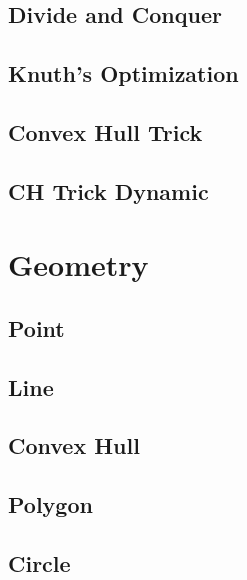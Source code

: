 \subsection{Divide and Conquer}
\raggedbottom
\hrulefill
\subsection{Knuth's Optimization}
\raggedbottom
\hrulefill
\subsection{Convex Hull Trick}
\raggedbottom
\hrulefill
\subsection{CH Trick Dynamic}
\raggedbottom
\hrulefill

\section{Geometry}
\subsection{Point}
\raggedbottom
\hrulefill
\subsection{Line}
\raggedbottom
\hrulefill
\subsection{Convex Hull}
\raggedbottom
\hrulefill
\subsection{Polygon}
\raggedbottom
\hrulefill
\subsection{Circle}
\raggedbottom
\hrulefill
